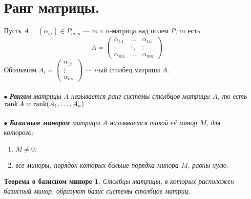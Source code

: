 \section{Ранг матрицы.}
Пусть  $A=(\alpha_{ij}) \in P_{m,n}$ --- $m\times n$-матрица над полем $P$, то есть
$$A= \begin{pmatrix} 
	\alpha_{11} & \dots & \alpha_{1n} 
	\\ \vdots & \ddots & \vdots
	\\ \alpha_{m1} & \dots & \alpha_{mn}
\end{pmatrix}$$ Обозначим $A_{i}=\begin{pmatrix} 
	\alpha_{1i}
	\\\vdots
	\\\alpha_{mi}
\end{pmatrix}$ --- $i$-ый столбец матрицы $A$.\\\\
$\bullet$ \textit{\textbf{Рангом} матрицы $A$ называется ранг системы столбцов матрицы $A$, то есть $\operatorname{rank} A = \operatorname{rank} (A_1,\dots,A_n)$}\\\\
$\bullet$ \textit{\textbf{Базисным минором} матрицы $A$ назыввается такой её минор $M$, для которого:}\begin{enumerate}
	\item $M\ne 0;$
	\item \textit{все миноры, порядок которых больше порядка минора $M$, равны нулю.}
\end{enumerate}
\newtheorem*{th7_1}{Теорема о базисном миноре}\begin{th7_1} Столбцы матрицы, в которых расположен базисный минор, образуют базис системы столбцов матриц. \end{th7_1}
